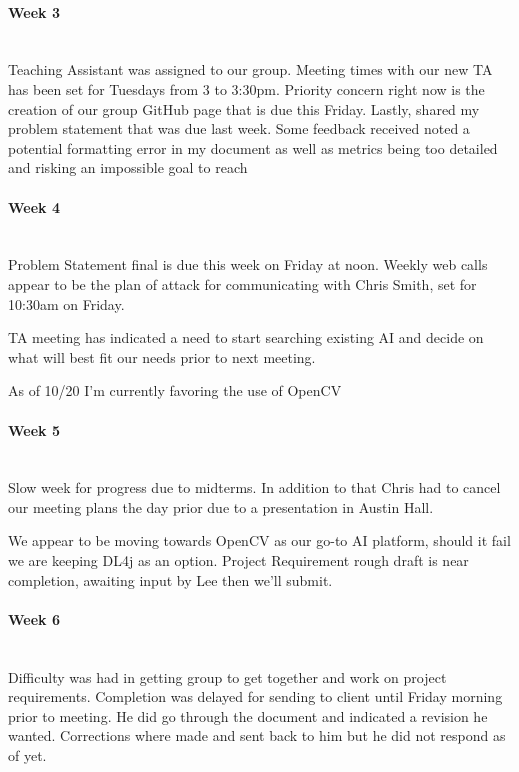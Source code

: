 \documentclass[article, onecolumn, draftclsnofoot,10pt, compsoc]{IEEEtran}
\begin{document}
\paragraph{Week 3}
\mbox{}\\
Teaching Assistant was assigned to our group. Meeting times with our new TA has been set for Tuesdays from 3 to 3:30pm. Priority concern right now is the creation of our group GitHub page that is due this Friday. Lastly, shared my problem statement that was due last week. Some feedback received noted a potential formatting error in my document as well as metrics being too detailed and risking an impossible goal to reach

\paragraph{Week 4}
\mbox{}\\
Problem Statement final is due this week on Friday at noon. Weekly web calls appear to be the plan of attack for communicating with Chris Smith, set for 10:30am on Friday.

TA meeting has indicated a need to start searching existing AI and decide on what will best fit our needs prior to next meeting.

As of 10/20 I'm currently favoring the use of OpenCV


\paragraph{Week 5}
\mbox{}\\
Slow week for progress due to midterms. In addition to that Chris had to cancel our meeting plans the day prior due to a presentation in Austin Hall.
 
We appear to be moving towards OpenCV as our go-to AI platform, should it fail we are keeping DL4j as an option. Project Requirement rough draft is near completion, awaiting input by Lee then we'll submit.


\paragraph{Week 6}
\mbox{}\\
Difficulty was had in getting group to get together and work on project requirements. Completion was delayed for sending to client until Friday morning prior to meeting. He did go through the document and indicated a revision he wanted. Corrections where made and sent back to him but he did not respond as of yet.
\end{document}
